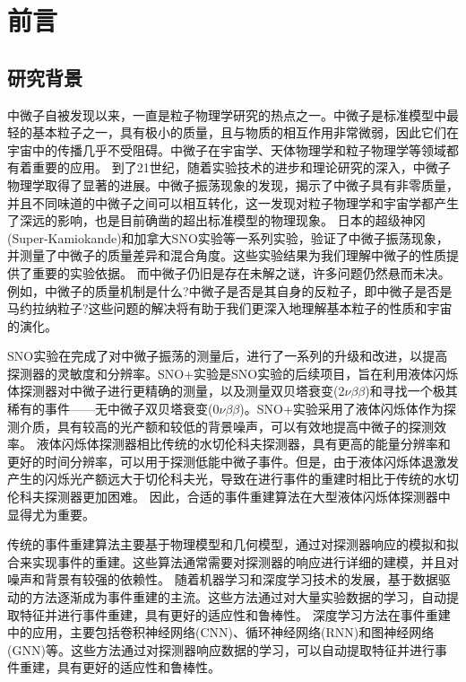 \chapter{前言}

\section{研究背景}

中微子自被发现以来，一直是粒子物理学研究的热点之一。中微子是标准模型中最轻的基本粒子之一，具有极小的质量，且与物质的相互作用非常微弱，因此它们在宇宙中的传播几乎不受阻碍。中微子在宇宙学、天体物理学和粒子物理学等领域都有着重要的应用。
到了21世纪，随着实验技术的进步和理论研究的深入，中微子物理学取得了显著的进展。中微子振荡现象的发现，揭示了中微子具有非零质量，并且不同味道的中微子之间可以相互转化，这一发现对粒子物理学和宇宙学都产生了深远的影响，也是目前确凿的超出标准模型的物理现象。
日本的超级神冈(Super-Kamiokande)和加拿大SNO实验等一系列实验，验证了中微子振荡现象\cite{PhysRevLett.87.071301}\cite{PhysRevLett.81.1562}，并测量了中微子的质量差异和混合角度。这些实验结果为我们理解中微子的性质提供了重要的实验依据。
而中微子仍旧是存在未解之谜，许多问题仍然悬而未决。例如，中微子的质量机制是什么?中微子是否是其自身的反粒子，即中微子是否是马约拉纳粒子?这些问题的解决将有助于我们更深入地理解基本粒子的性质和宇宙的演化。

SNO实验在完成了对中微子振荡的测量后，进行了一系列的升级和改进，以提高探测器的灵敏度和分辨率。SNO+实验\cite{andringa2016current}\cite{albanese2021sno+}是SNO实验的后续项目，旨在利用液体闪烁体探测器对中微子进行更精确的测量，以及测量双贝塔衰变(2$\nu\beta\beta$)和寻找一个极其稀有的事件——无中微子双贝塔衰变(0$\nu\beta\beta$)\cite{albanese2021sno+}。SNO+实验采用了液体闪烁体作为探测介质，具有较高的光产额和较低的背景噪声，可以有效地提高中微子的探测效率。
液体闪烁体探测器相比传统的水切伦科夫探测器，具有更高的能量分辨率和更好的时间分辨率，可以用于探测低能中微子事件。但是，由于液体闪烁体退激发产生的闪烁光产额远大于切伦科夫光，导致在进行事件的重建时相比于传统的水切伦科夫探测器更加困难。
因此，合适的事件重建算法在大型液体闪烁体探测器中显得尤为重要。

传统的事件重建算法主要基于物理模型和几何模型，通过对探测器响应的模拟和拟合来实现事件的重建。这些算法通常需要对探测器的响应进行详细的建模，并且对噪声和背景有较强的依赖性。
随着机器学习和深度学习技术的发展，基于数据驱动的方法逐渐成为事件重建的主流。这些方法通过对大量实验数据的学习，自动提取特征并进行事件重建，具有更好的适应性和鲁棒性。
深度学习方法在事件重建中的应用，主要包括卷积神经网络(CNN)、循环神经网络(RNN)和图神经网络(GNN)等。这些方法通过对探测器响应数据的学习，可以自动提取特征并进行事件重建，具有更好的适应性和鲁棒性。

